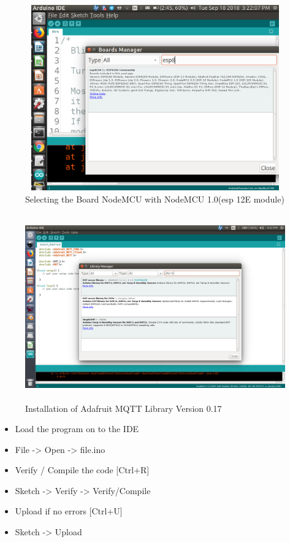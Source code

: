 \documentclass[12pt,a4paper]{article}
\begin{document}
\begin{flushleft}
\begin{figure}[h!]
    \centering
	\includegraphics[width=12cm, height=8cm]{Prog10/7.png}
	\caption{Selecting the Board NodeMCU with NodeMCU 1.0(esp 12E module)}
\end{figure}
\vspace{5mm}


\begin{figure}[h!]
    \centering
	\includegraphics[width=12cm, height=8cm]{Prog10/10.png}
	\caption{Installation of Adafruit MQTT Library Version 0.17}
\end{figure}
\vspace{5mm}
\begin{itemize}[noitemsep,nolistsep]
    \item Load the program on to the IDE
    \item File  ->  Open -> file.ino
    \item Verify / Compile the code [Ctrl+R]
    \item Sketch -> Verify -> Verify/Compile 
    \item Upload if no errors [Ctrl+U]
    \item Sketch -> Upload
\end{itemize}


\end{flushleft}
\end{document}
